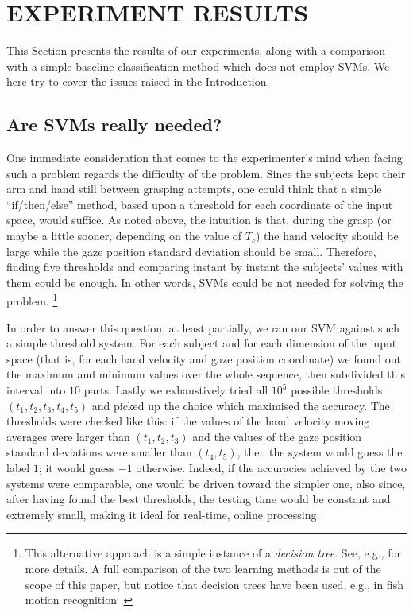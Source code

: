 \documentclass{article}
\begin{document}
\section{EXPERIMENT RESULTS}
\label{sec:res}

This Section presents the results of our experiments, along with a
comparison with a simple baseline classification method which does not
employ SVMs. We here try to cover the issues raised in the
Introduction.

\subsection{Are SVMs really needed?}

One immediate consideration that comes to the experimenter's mind when
facing such a problem regards the difficulty of the problem. Since the
subjects kept their arm and hand still between grasping attempts, one
could think that a simple ``if/then/else'' method, based upon a
threshold for each coordinate of the input space, would suffice. As
noted above, the intuition is that, during the grasp (or maybe a
little sooner, depending on the value of $T_c$) the hand velocity
should be large while the gaze position standard deviation should be
small. Therefore, finding five thresholds and comparing instant by
instant the subjects' values with them could be enough. In other
words, SVMs could be not needed for solving the problem. \footnote{This
alternative approach is a simple instance of a \emph{decision
tree}. See, e.g., \cite{dtrees} for more details. A full comparison of
the two learning methods is out of the scope of this paper, but notice
that decision trees have been used, e.g., in fish motion recognition
\cite{fish}.}

In order to answer this question, at least partially, we ran our SVM
against such a simple threshold system. For each subject and for each
dimension of the input space (that is, for each hand velocity and gaze
position coordinate) we found out the maximum and minimum values over
the whole sequence, then subdivided this interval into $10$
parts. Lastly we exhaustively tried all $10^5$ possible thresholds
$(t_1,t_2,t_3,t_4,t_5)$ and picked up the choice which maximised the
accuracy. The thresholds were checked like this: if the values of the
hand velocity moving averages were larger than $(t_1,t_2,t_3)$ and the
values of the gaze position standard deviations were smaller than
$(t_4,t_5)$, then the system would guess the label $1$; it would guess
$-1$ otherwise. Indeed, if the accuracies achieved by the two systems
were comparable, one would be driven toward the simpler one, also
since, after having found the best thresholds, the testing time would
be constant and extremely small, making it ideal for real-time, online
processing.
\end{document}
